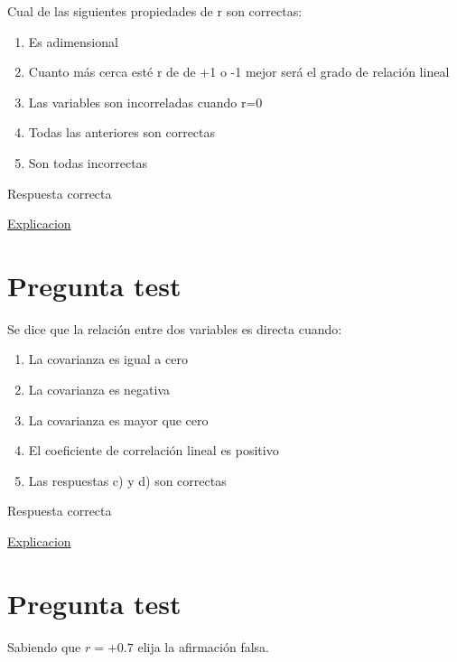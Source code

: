 \documentclass[
]{book}
\providecommand{\tightlist}{%
  \setlength{\itemsep}{0pt}\setlength{\parskip}{0pt}}
\begin{document}
Cual de las siguientes propiedades de r son correctas:

\begin{enumerate}
\def\labelenumi{\alph{enumi})}
\tightlist
\item
  Es adimensional
\item
  Cuanto más cerca esté r de de +1 o -1 mejor será el grado de relación lineal
\item
  Las variables son incorreladas cuando r=0
\item
  Todas las anteriores son correctas
\item
  Son todas incorrectas
\end{enumerate}

Respuesta correcta

\href{https://1fjmanzano.github.io/bioestadistica/relaci\%C3\%B3n-entre-variables-nume\%CC\%81ricas.html\#coeficiente-de-correlacio\%CC\%81n}{Explicacion}

\hypertarget{pregunta-test-141}{%
\section{Pregunta test}\label{pregunta-test-141}}

Se dice que la relación entre dos variables es directa cuando:

\begin{enumerate}
\def\labelenumi{\alph{enumi})}
\tightlist
\item
  La covarianza es igual a cero
\item
  La covarianza es negativa
\item
  La covarianza es mayor que cero
\item
  El coeficiente de correlación lineal es positivo
\item
  Las respuestas c) y d) son correctas
\end{enumerate}

Respuesta correcta

\href{https://1fjmanzano.github.io/bioestadistica/relaci\%C3\%B3n-entre-variables-nume\%CC\%81ricas.html\#coeficiente-de-correlacio\%CC\%81n}{Explicacion}

\hypertarget{pregunta-test-142}{%
\section{Pregunta test}\label{pregunta-test-142}}

Sabiendo que \(r=+0.7\) elija la afirmación falsa.
\end{document}
